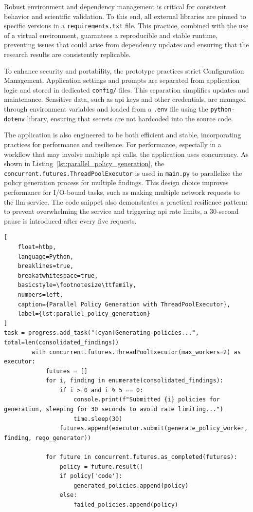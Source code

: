 Robust environment and dependency management is critical for consistent behavior and scientific validation. To this end, all external libraries are pinned to specific versions in a \texttt{requirements.txt} file. This practice, combined with the use of a virtual environment, guarantees a reproducible and stable runtime, preventing issues that could arise from dependency updates and ensuring that the research results are consistently replicable.

To enhance security and portability, the prototype practices strict Configuration Management. Application settings and prompts are separated from application logic and stored in dedicated \texttt{config/} files. This separation simplifies updates and maintenance. Sensitive data, such as \gls{api} keys and other credentials, are managed through environment variables and loaded from a \texttt{.env} file using the \texttt{python-dotenv} library, ensuring that secrets are not hardcoded into the source code.

The application is also engineered to be both efficient and stable, incorporating practices for performance and resilience. For performance, especially in a workflow that may involve multiple \gls{api} calls, the application uses concurrency. As shown in Listing~\ref{lst:parallel_policy_generation}, the \texttt{concurrent.futures.ThreadPoolExecutor} is used in \texttt{main.py} to parallelize the policy generation process for multiple findings. This design choice improves performance for I/O-bound tasks, such as making multiple network requests to the \gls{llm} service. The code snippet also demonstrates a practical resilience pattern: to prevent overwhelming the service and triggering \gls{api} rate limits, a 30-second pause is introduced after every five requests.

\begin{lstlisting}[
    float=htbp,
    language=Python, 
    breaklines=true, 
    breakatwhitespace=true,
    basicstyle=\footnotesize\ttfamily, 
    numbers=left,
    caption={Parallel Policy Generation with ThreadPoolExecutor},
    label={lst:parallel_policy_generation}
]
task = progress.add_task("[cyan]Generating policies...", total=len(consolidated_findings))
        with concurrent.futures.ThreadPoolExecutor(max_workers=2) as executor:
            futures = []
            for i, finding in enumerate(consolidated_findings):
                if i > 0 and i % 5 == 0:
                    console.print(f"Submitted {i} policies for generation, sleeping for 30 seconds to avoid rate limiting...")
                    time.sleep(30)
                futures.append(executor.submit(generate_policy_worker, finding, rego_generator))

            for future in concurrent.futures.as_completed(futures):
                policy = future.result()
                if policy['code']:
                    generated_policies.append(policy)
                else:
                    failed_policies.append(policy)
\end{lstlisting}

